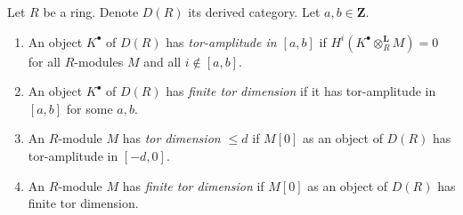 \begin{definition}
\label{definition-tor-amplitude}
Let $R$ be a ring. Denote $D(R)$ its derived category.
Let $a, b \in \mathbf{Z}$.
\begin{enumerate}
\item An object $K^\bullet$ of $D(R)$ has
{\it tor-amplitude in $[a, b]$}
if $H^i(K^\bullet \otimes_R^\mathbf{L} M) = 0$ for all $R$-modules
$M$ and all $i \not \in [a, b]$.
\item An object $K^\bullet$ of $D(R)$ has {\it finite tor dimension}
if it has tor-amplitude in $[a, b]$ for some $a, b$.
\item An $R$-module $M$ has {\it tor dimension $\leq d$}
if $M[0]$ as an object of $D(R)$ has tor-amplitude in $[-d, 0]$.
\item An $R$-module $M$ has {\it finite tor dimension}
if $M[0]$ as an object of $D(R)$ has finite tor dimension.
\end{enumerate}
\end{definition}